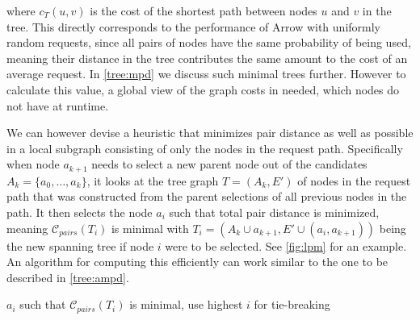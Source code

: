 \documentclass[a4paper, oneside]{discothesis}
\begin{document}
where $c_T(u,v)$ is the cost of the shortest path between nodes $u$ and $v$ in the tree. This directly corresponds to the performance of Arrow with uniformly random requests, since all pairs of nodes have the same probability of being used, meaning their distance in the tree contributes the same amount to the cost of an average request. In \autoref{tree:mpd} we discuss such minimal trees further. However to calculate this value, a global view of the graph costs in needed, which nodes do not have at runtime.

We can however devise a heuristic that minimizes pair distance as well as possible in a local subgraph consisting of only the nodes in the request path. Specifically when node $a_{k+1}$ needs to select a new parent node out of the candidates $A_k=\{a_{0},\dots,a_{k}\}$, it looks at the tree graph $T=(A_k,E')$ of nodes in the request path that was constructed from the parent selections of all previous nodes in the path. It then selects the node $a_{i}$ such that total pair distance is minimized, meaning $\mathcal{C}_{pairs}(T_i)$ is minimal with $T_i=(A_k\cup a_{k+1},E'\cup(a_{i},a_{k+1}))$ being the new spanning tree if node $i$ were to be selected. See \autoref{fig:lpm} for an example. An algorithm for computing this efficiently can work similar to the one to be described in \autoref{tree:ampd}.

\begin{algorithmic}
\State\Return$a_{i}$ such that $\mathcal{C}_{pairs}(T_i)$ is minimal, use highest $i$ for tie-breaking
\EndFunction
\end{algorithmic}
\end{document}

